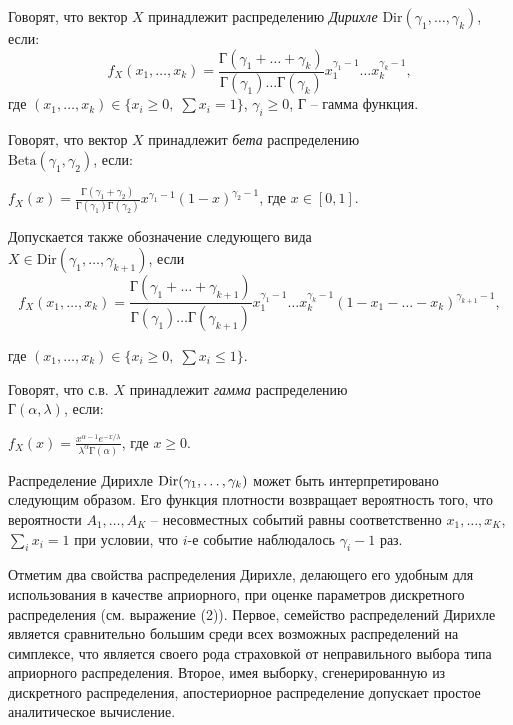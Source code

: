 \begin{remark}

Говорят, что вектор $X$ принадлежит распределению \textit{Дирихле} $\mathrm{Dir}(\gamma_1, \ldots, \gamma_{k})$, если: 
\[
f_{X}(x_1, \ldots, x_k) = \frac{\text{Г}(\gamma_1 +  \ldots + \gamma_{k})}{\text{Г}(\gamma_1)  \ldots  \text{Г}(\gamma_{k})} x_1^{\gamma_1-1} \ldots x_k^{\gamma_k-1},
\] 
\noindent где  $(x_1, \ldots, x_k) \in \{x_i \geq 0, \; \sum x_i  = 1 \}$, $\gamma_i \geq 0$, $\text{Г}$ -- гамма функция. 

Говорят, что вектор $X$ принадлежит \textit{бета} распределению \\  $\mathrm{Beta}(\gamma_1, \gamma_2)$, если: 

\begin{center}
$f_{X}(x) = \frac{\text{Г}(\gamma_1 + \gamma_2)}{\text{Г}(\gamma_1) \text{Г}(\gamma_2)} x^{\gamma_1-1} (1 - x)^{\gamma_2-1}$, где  $x \in [0, 1]$.
\end{center} 


Допускается также обозначение следующего вида \\ $ X \in \mathrm{Dir}(\gamma_1, \ldots, \gamma_{k+1})$, если 
\[
f_{X}(x_1, \ldots, x_k) = \frac{\text{Г}(\gamma_1 +  \ldots + \gamma_{k+1})}{\text{Г}(\gamma_1)  \ldots  \text{Г}(\gamma_{k+1})} x_1^{\gamma_1-1} \ldots x_k^{\gamma_k-1} (1 - x_1 - \ldots - x_k)^{\gamma_{k+1}-1},
\] 


\noindent где  $(x_1, \ldots, x_k) \in \{x_i \geq 0, \; \sum x_i \leq 1 \}$.

Говорят, что с.в. $X$ принадлежит \textit{гамма} распределению
\\  $\text{Г}(\alpha, \lambda)$, если: 
\begin{center}
$f_{X}(x) = \frac{x^{\alpha-1} e^{-x/\lambda}}{\lambda^\alpha\text{Г}(\alpha)}$,  где  $x \geq 0$.
\end{center}

Распределение Дирихле $\mathrm{Dir}(\gamma_1, \ldots, \gamma_{k})$ может быть интерпретировано следующим образом. Его функция плотности возвращает вероятность того, что вероятности $A_1,\ldots,A_K$ -- несовместных  событий равны соответственно $x_1, \ldots, x_K$, $\sum_i x_i = 1$ при условии, что $i$-е событие наблюдалось $\gamma_i-1$ раз. 

Отметим два свойства распределения Дирихле, делающего его удобным для использования в качестве априорного, при оценке параметров дискретного распределения (см. выражение (2)). Первое, семейство распределений Дирихле является сравнительно большим среди всех возможных распределений на симплексе, что является своего рода страховкой от неправильного выбора типа априорного распределения. Второе, имея выборку, сгенерированную из дискретного распределения, апостериорное распределение допускает простое аналитическое вычисление. 


\end{remark}
